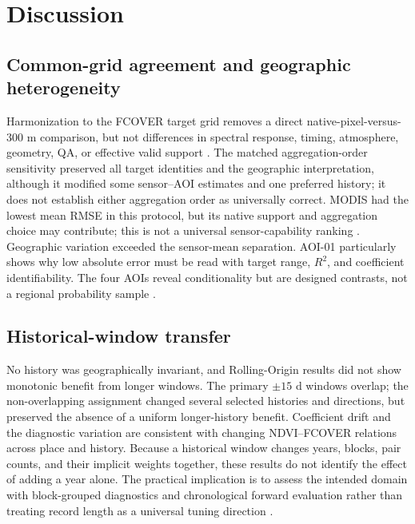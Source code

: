 \section{Discussion}
\subsection{Common-grid agreement and geographic heterogeneity}
Harmonization to the FCOVER target grid removes a direct native-pixel-versus-300 m comparison, but not differences in spectral response, timing, atmosphere, geometry, QA, or effective valid support \citep{claverie2018,zhang2018ndvi,shang2019,trevisiol2024}. The matched aggregation-order sensitivity preserved all target identities and the geographic interpretation, although it modified some sensor--AOI estimates and one preferred history; it does not establish either aggregation order as universally correct. MODIS had the lowest mean RMSE in this protocol, but its native support and aggregation choice may contribute; this is not a universal sensor-capability ranking \citep{woodcock1987,atkinson2000}. Geographic variation exceeded the sensor-mean separation. AOI-01 particularly shows why low absolute error must be read with target range, $R^2$, and coefficient identifiability. The four AOIs reveal conditionality but are designed contrasts, not a regional probability sample \citep{roberts2017,meyer2018,ploton2020}.

\subsection{Historical-window transfer}
No history was geographically invariant, and Rolling-Origin results did not show monotonic benefit from longer windows. The primary $\pm15$ d windows overlap; the non-overlapping assignment changed several selected histories and directions, but preserved the absence of a uniform longer-history benefit. Coefficient drift and the diagnostic variation are consistent with changing NDVI--FCOVER relations across place and history. Because a historical window changes years, blocks, pair counts, and their implicit weights together, these results do not identify the effect of adding a year alone. The practical implication is to assess the intended domain with block-grouped diagnostics and chronological forward evaluation rather than treating record length as a universal tuning direction \citep{tashman2000,bergmeir2012}.

